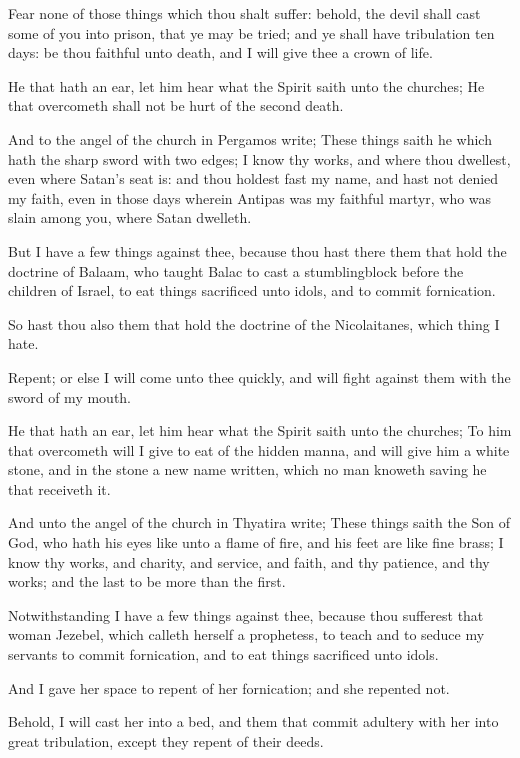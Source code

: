 \verse Fear none of those things which thou shalt suffer: behold, the devil shall cast some of you into prison, that ye may be tried; and ye shall have tribulation ten days: be thou faithful unto death, and I will give thee a crown of life.

\verse He that hath an ear, let him hear what the Spirit saith unto the churches; He that overcometh shall not be hurt of the second death.

\verse And to the angel of the church in Pergamos write; These things saith he which hath the sharp sword with two edges; \verse I know thy works, and where thou dwellest, even where Satan's seat is: and thou holdest fast my name, and hast not denied my faith, even in those days wherein Antipas was my faithful martyr, who was slain among you, where Satan dwelleth.

\verse But I have a few things against thee, because thou hast there them that hold the doctrine of Balaam, who taught Balac to cast a stumblingblock before the children of Israel, to eat things sacrificed unto idols, and to commit fornication.

\verse So hast thou also them that hold the doctrine of the Nicolaitanes, which thing I hate.

\verse Repent; or else I will come unto thee quickly, and will fight against them with the sword of my mouth.

\verse He that hath an ear, let him hear what the Spirit saith unto the churches; To him that overcometh will I give to eat of the hidden manna, and will give him a white stone, and in the stone a new name written, which no man knoweth saving he that receiveth it.

\verse And unto the angel of the church in Thyatira write; These things saith the Son of God, who hath his eyes like unto a flame of fire, and his feet are like fine brass; \verse I know thy works, and charity, and service, and faith, and thy patience, and thy works; and the last to be more than the first.

\verse Notwithstanding I have a few things against thee, because thou sufferest that woman Jezebel, which calleth herself a prophetess, to teach and to seduce my servants to commit fornication, and to eat things sacrificed unto idols.

\verse And I gave her space to repent of her fornication; and she repented not.

\verse Behold, I will cast her into a bed, and them that commit adultery with her into great tribulation, except they repent of their deeds.

